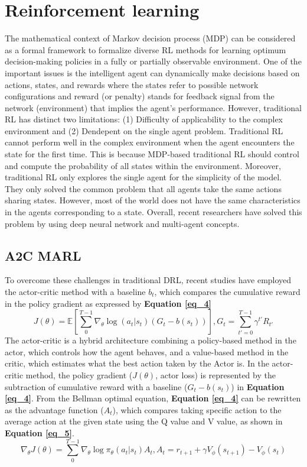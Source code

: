 \documentclass[conference]{IEEEtran}
\begin{document}
\section{Reinforcement learning}
The mathematical context of Markov decision process (MDP) can be considered as a formal framework to formalize diverse RL methods for learning optimum decision-making policies in a fully or partially observable environment. One of the important issues is the intelligent agent can dynamically make decisions based on actions, states, and rewards where the states refer to possible network configurations and reward (or penalty) stands for feedback signal from the network (environment) that implies the agent’s performance. However, traditional RL has distinct two limitations: (1) Difficulty of applicability to the complex environment and (2) Dendepent on the single agent problem. Traditional RL cannot perform well in the complex environment when the agent encounters the state for the first time. This is because MDP-based traditional RL should control and compute the probability of all states within the environment. Moreover, traditional RL only explores the single agent for the simplicity of the model. They only solved the common problem that all agents take the same actions sharing states. However, most of the world does not have the same characteristics in the agents corresponding to a state. Overall, recent researchers have solved this problem by using deep neural network and multi-agent concepts. 

\subsection{A2C MARL}
To overcome these challenges in traditional DRL, recent studies have employed the actor-critic method with a baseline $b_t$, which compares the cumulative reward in the policy gradient as expressed by \textbf{Equation \eqref{eq_4}}
\begin{equation} \label{eq_4}
    J(\theta) = \mathbb{E}[\sum_{0}^{T-1}\nabla_{\theta}\log(a_t|s_t)(G_t-b(s_t))], G_t = \sum_{t'=0}^{T-1}\gamma^{t'}R_{t'}
\end{equation}
The actor-critic is a hybrid architecture combining a policy-based method in the actor, which controls how the agent behaves, and a value-based method in the critic, which estimates what the best action taken by the Actor is. In the actor-critic method, the policy gradient ($J(\theta)$, actor loss) is represented by the subtraction of cumulative reward with a baseline ($G_t - b(s_t)$) in \textbf{Equation \eqref{eq_4}}. From the Bellman optimal equation, \textbf{Equation \eqref{eq_4}} can be rewritten as the advantage function ($A_t$), which compares taking specific action to the average action at the given state using the Q value and V value, as shown in \textbf{Equation \eqref{eq_5}}. 
\begin{equation} \label{eq_5}
    \nabla_{\theta} J(\theta) =\sum_{0}^{T-1}\nabla_{\theta}\log\pi_\theta(a_t|s_t)A_t , A_t = r_{t+1} + \gamma V_{\phi}(s_{t+1}) - V_{\phi}(s_t)
\end{equation}
\end{document}
